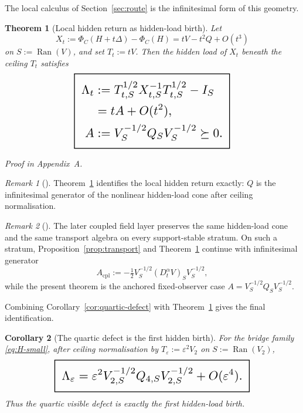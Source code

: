 \documentclass[11pt,a4paper]{article}
\numberwithin{equation}{section}
\DeclareMathOperator{\Ran}{Ran}
\newcommand{\geomboxed}[1]{%
  \setlength{\fboxsep}{8pt}%
  \setlength{\fboxrule}{0.9pt}%
  \fbox{\scalebox{1.5}{$\displaystyle #1$}}%
}
\theoremstyle{thmcompact}
\newtheorem{theorem}{Theorem}[section]
\newtheorem{corollary}[theorem]{Corollary}
\theoremstyle{remark}
\newtheorem*{remarkplain}{Remark}
\newenvironment{remark}[1][]%
{\begin{remarkbox}\begin{remarkplain}[#1]\normalfont}
{\end{remarkplain}\end{remarkbox}}
\newcommand{\proofappendix}{\par{\hfill\scriptsize\emph{Proof in Appendix~A.}}\par}
\begin{document}
The local calculus of Section~\ref{sec:route} is the infinitesimal form of this geometry.

\begin{theorem}[Local hidden return as hidden-load birth]
\label{thm:birth}
Let
\begin{equation}
X_t:=\Phi_C(H+t\Delta)-\Phi_C(H)=tV-t^2Q+O(t^3)
\label{eq:Xt-def}
\end{equation}
on $S:=\Ran(V)$, and set $T_t:=tV$. Then the hidden load of $X_t$ beneath the ceiling $T_t$ satisfies
\begin{equation}
\label{eq:birth-law}
\geomboxed{\begin{aligned}
\Lambda_t&:=T_{t,S}^{1/2}X_{t,S}^{-1}T_{t,S}^{1/2}-I_S\\
&=tA+O(t^2),\\
A&:=V_S^{-1/2}Q_SV_S^{-1/2}\succeq 0.
\end{aligned}}
\end{equation}
\end{theorem}

\proofappendix

\begin{remark}
Theorem~\ref{thm:birth} identifies the local hidden return exactly: $Q$ is the infinitesimal generator of the nonlinear hidden-load cone after ceiling normalisation.
\end{remark}

\begin{remark}
The later coupled field layer preserves the same hidden-load cone and the same transport algebra on every support-stable stratum. On such a stratum, Proposition~\ref{prop:transport} and Theorem~\ref{thm:birth} continue with infinitesimal generator
\[
A_{\mathrm{cpl}}:=-\tfrac12 V_S^{-1/2}(D_t^\alpha V)_S V_S^{-1/2},
\]
while the present theorem is the anchored fixed-observer case $A=V_S^{-1/2}Q_SV_S^{-1/2}$.
\end{remark}

Combining Corollary~\ref{cor:quartic-defect} with Theorem~\ref{thm:birth} gives the final identification.

\begin{corollary}[The quartic defect is the first hidden birth]
\label{cor:final}
For the bridge family \eqref{eq:H-small}, after ceiling normalisation by $T_{\varepsilon}:=\varepsilon^2V_2$ on $S:=\Ran(V_2)$,
\begin{equation}
\label{eq:final-birth}
\geomboxed{\Lambda_{\varepsilon}
=
\varepsilon^2V_{2,S}^{-1/2}Q_{4,S}V_{2,S}^{-1/2}+O(\varepsilon^4).}
\end{equation}
Thus the quartic visible defect is exactly the first hidden-load birth.
\end{corollary}
\end{document}

